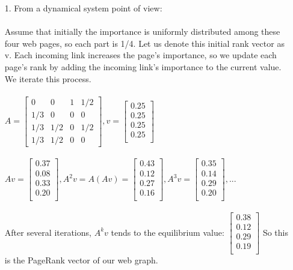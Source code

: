\documentclass[12pt]{article}
\begin{document}
\begin{itemize}
    \item[1.] From a dynamical system point of view:
\paragraph{} Assume that initially the importance is uniformly distributed among these four web pages, so each part is 1/4. Let us denote this initial rank vector as v. Each incoming link increases the page's importance, so we update each page's rank by adding the incoming link's importance to the current value. We iterate this process.

\paragraph{}$A = \begin{bmatrix}
0 & 0 & 1 & 1/2\\
1/3 & 0 & 0 & 0\\
1/3 & 1/2 & 0 & 1/2\\
1/3 & 1/2 & 0 & 0
\end{bmatrix}
, v = \begin{bmatrix}0.25 \\0.25 \\0.25 \\0.25 \\\end{bmatrix}$
\paragraph{} $Av = \begin{bmatrix}0.37 \\0.08 \\0.33 \\0.20 \\\end{bmatrix},  A^2v = A(Av) = \begin{bmatrix}0.43 \\0.12 \\0.27 \\0.16 \\\end{bmatrix}, A^3v = \begin{bmatrix}0.35 \\0.14 \\0.29 \\0.20 \\\end{bmatrix},  ...$
\paragraph{} After several iterations, $A^kv$ tends to the equilibrium value: $\begin{bmatrix}0.38 \\0.12 \\0.29 \\0.19 \\\end{bmatrix}$ So this is the PageRank vector of our web graph.


\end{itemize}
\end{document}
